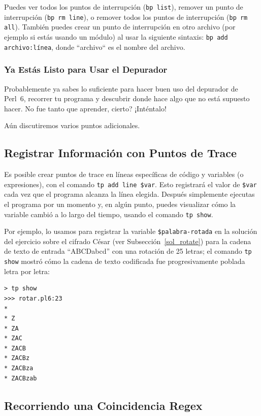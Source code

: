Puedes ver todos los puntos de interrupción ({\tt bp list}),
remover un punto de interrupción ({\tt bp rm line}), o
remover todos los puntos de interrupción ({\tt bp rm all}).
También puedes crear un punto de interrupción en otro 
archivo (por ejemplo si estás usando un módulo) 
al usar la siguiente sintaxis: {\tt bp add archivo:línea},
donde ``archivo`` es el nombre del archivo.

\subsubsection{Ya Estás Listo para Usar el Depurador}

Probablemente ya sabes lo suficiente para hacer buen uso del 
depurador de Perl~6, recorrer tu programa y descubrir 
donde hace algo que no está supuesto hacer. No fue tanto
que aprender, cierto? ¡Inténtalo!

Aún discutiremos varios puntos adicionales.

\subsection{Registrar Información con Puntos de Trace}

Es posible crear puntos de trace en líneas específicas de código y
variables (o expresiones), con el comando {\tt tp add line \$var}.
Esto registrará el valor de \verb|$var| cada vez que el programa
alcanza la línea elegida. Después simplemente ejecutas el 
programa por un momento y, en algún punto, puedes visualizar
cómo la variable cambió a lo largo del tiempo, usando el comando {\tt tp show}.

Por ejemplo, lo usamos para registrar la variable \verb|$palabra-rotada|
en la solución del ejercicio sobre el cifrado César (ver Subsección~\ref{sol_rotate}) 
para la cadena de texto de entrada ``ABCDabcd'' con una rotación
de 25 letras; el comando {\tt tp show} mostró cómo la cadena de texto
codificada fue progresivamente poblada letra por letra:

\begin{verbatim}
> tp show
>>> rotar.pl6:23
*
* Z
* ZA
* ZAC
* ZACB
* ZACBz
* ZACBza
* ZACBzab
\end{verbatim}

\subsection{Recorriendo una Coincidencia Regex}
\label{regex-debugging}

